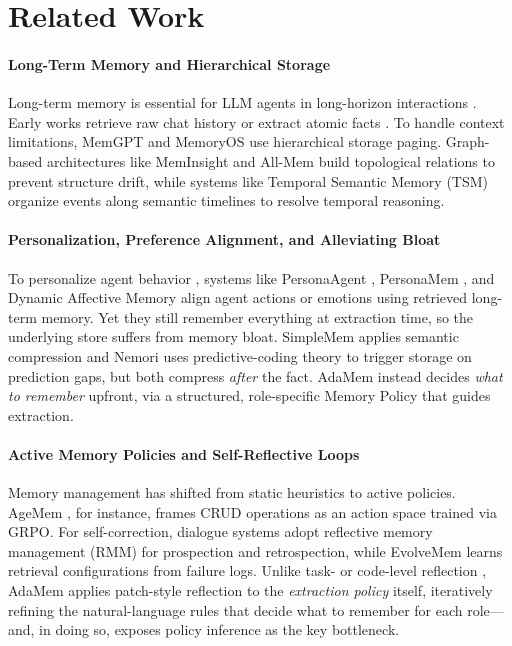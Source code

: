 \documentclass[11pt]{article}
\begin{document}
\section{Related Work}
\paragraph{Long-Term Memory and Hierarchical Storage}
Long-term memory is essential for LLM agents in long-horizon interactions \cite{wang2023survey}. Early works retrieve raw chat history \cite{park2023generative} or extract atomic facts \cite{mem0, zhong2023memory}. To handle context limitations, MemGPT \cite{packer2023memgpt} and MemoryOS \cite{memoryos2025} use hierarchical storage paging. Graph-based architectures like MemInsight \cite{meminsight2025} and All-Mem \cite{allmem2026} build topological relations to prevent structure drift, while systems like Temporal Semantic Memory (TSM) \cite{tsm2026} organize events along semantic timelines to resolve temporal reasoning.

\paragraph{Personalization, Preference Alignment, and Alleviating Bloat}
To personalize agent behavior \cite{modarressi2023retrieval}, systems like PersonaAgent \cite{personaagent2025}, PersonaMem \cite{personamem2025}, and Dynamic Affective Memory \cite{affectivemem2025} align agent actions or emotions using retrieved long-term memory. Yet they still remember everything at extraction time, so the underlying store suffers from memory bloat. SimpleMem \cite{simplemem2026} applies semantic compression and Nemori \cite{nemori2025} uses predictive-coding theory to trigger storage on prediction gaps, but both compress \emph{after} the fact. AdaMem instead decides \emph{what to remember} upfront, via a structured, role-specific Memory Policy that guides extraction.

\paragraph{Active Memory Policies and Self-Reflective Loops}
Memory management has shifted from static heuristics to active policies. AgeMem \cite{agemem2026}, for instance, frames CRUD operations as an action space trained via GRPO. For self-correction, dialogue systems adopt reflective memory management (RMM) \cite{prospectretro2025} for prospection and retrospection, while EvolveMem \cite{evolvemem2026} learns retrieval configurations from failure logs. Unlike task- or code-level reflection \cite{shinn2023reflexion, madaan2023self}, AdaMem applies patch-style reflection to the \emph{extraction policy} itself, iteratively refining the natural-language rules that decide what to remember for each role---and, in doing so, exposes policy inference as the key bottleneck.
\end{document}
